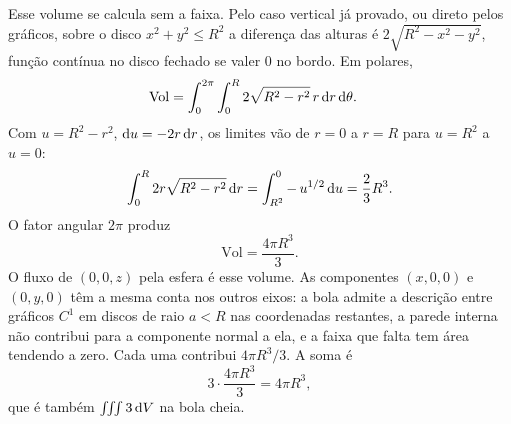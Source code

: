 \documentclass[11pt,a4paper]{article}
\begin{document}
Esse volume se calcula sem a faixa. Pelo caso vertical já provado, ou direto pelos gráficos, sobre o disco $x^2+y^2\le R^2$ a diferença das alturas é $2\sqrt{R^2-x^2-y^2}$, função contínua no disco fechado se valer $0$ no bordo. Em polares,
\begin{align*}
\mathrm{Vol}
&=\int_0^{2\pi}\int_0^R 2\sqrt{R^2-r^2}\, r\,\mathrm{d} r\,\mathrm{d}\theta.
\end{align*}
Com $u=R^2-r^2$, $\mathrm{d} u=-2r\,\mathrm{d} r$, os limites vão de $r=0$ a $r=R$ para $u=R^2$ a $u=0$:
\[
\int_0^R 2r\sqrt{R^2-r^2}\,\mathrm{d} r
=\int_{R^2}^{0}-\,u^{1/2}\,\mathrm{d} u
=\frac23 R^3.
\]
O fator angular $2\pi$ produz
\[
\mathrm{Vol}=\frac{4\pi R^3}{3}.
\]
O fluxo de $(0,0,z)$ pela esfera é esse volume. As componentes $(x,0,0)$ e $(0,y,0)$ têm a mesma conta nos outros eixos: a bola admite a descrição entre gráficos $C^1$ em discos de raio $a<R$ nas coordenadas restantes, a parede interna não contribui para a componente normal a ela, e a faixa que falta tem área tendendo a zero. Cada uma contribui $4\pi R^3/3$. A soma é
\[
3\cdot\frac{4\pi R^3}{3}=4\pi R^3,
\]
que é também $\iiint 3\,\mathrm{d} V$ na bola cheia.
\end{document}
